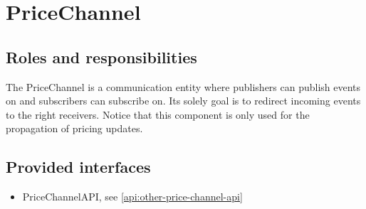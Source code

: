 \section{PriceChannel}
\label{element:price-channel}

\subsection{Roles and responsibilities}

\npar The PriceChannel is a communication entity where publishers can publish
events on and subscribers can subscribe on. Its solely goal is to redirect
incoming events to the right receivers. Notice that this component is only used
for the propagation of pricing updates.

\subsection{Provided interfaces}

\begin{itemize}
  \item PriceChannelAPI, see \ref{api:other-price-channel-api}
\end{itemize}